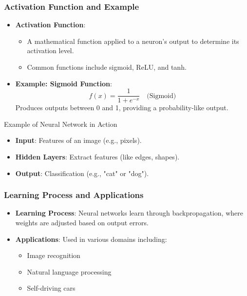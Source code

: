 \documentclass[aspectratio=169]{beamer}
\begin{document}
\begin{frame}[fragile]
    \frametitle{Activation Function and Example}
    \begin{itemize}
        \item \textbf{Activation Function}:
            \begin{itemize}
                \item A mathematical function applied to a neuron's output to determine its activation level.
                \item Common functions include sigmoid, ReLU, and tanh.
            \end{itemize}
        \item \textbf{Example: Sigmoid Function}:
            \begin{equation}
                f(x) = \frac{1}{1 + e^{-x}} \quad \text{(Sigmoid)}
            \end{equation}
            Produces outputs between 0 and 1, providing a probability-like output.
    \end{itemize}
    
    \begin{block}{Example of Neural Network in Action}
        \begin{itemize}
            \item \textbf{Input}: Features of an image (e.g., pixels).
            \item \textbf{Hidden Layers}: Extract features (like edges, shapes).
            \item \textbf{Output}: Classification (e.g., "cat" or "dog").
        \end{itemize}
    \end{block}
\end{frame}

\begin{frame}[fragile]
    \frametitle{Learning Process and Applications}
    \begin{itemize}
        \item \textbf{Learning Process}: Neural networks learn through backpropagation, where weights are adjusted based on output errors.
        \item \textbf{Applications}: Used in various domains including:
            \begin{itemize}
                \item Image recognition
                \item Natural language processing
                \item Self-driving cars
            \end{itemize}
    \end{itemize}
\end{frame}
\end{document}
